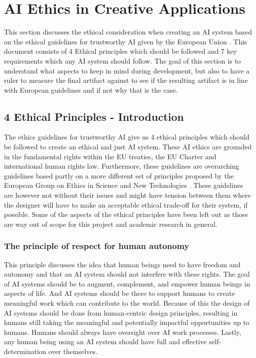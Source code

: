 \section{AI Ethics in Creative Applications} \label{AIethics}
This section discusses the ethical consideration when creating an AI system based on the ethical guidelines for trustworthy AI given by the European Union \cite{europeancommission2019ethics}. This document consists of 4 Ethical principles which should be followed and 7 key requirements which any AI system should follow. The goal of this section is to understand what aspects to keep in mind during development, but also to have a ruler to measure the final artifact against to see if the resulting artifact is in line with European guidelines and if not why that is the case.

\subsection{4 Ethical Principles - Introduction}
The ethics guidelines for trustworthy AI give us 4 ethical principles which should be followed to create an ethical and just AI system. These AI ethics are grounded in the fundamental rights within the EU treaties, the EU Charter and international human rights law. Furthermore, these guidelines are overarching guidelines based partly on a more different set of principles proposed by the European Group on Ethics in Science and New Technologies \cite{floridi2018ai4people}. These guidelines are however not without their issues and might have tension between them where the designer will have to make an acceptable ethical trade-off for their system, if possible. Some of the aspects of the ethical principles have been left out as those are way out of scope for this project and academic research in general.

\subsubsection*{The principle of respect for human autonomy}
This principle discusses the idea that human beings need to have freedom and autonomy and that an AI system should not interfere with these rights. The goal of AI systems should be to augment, complement, and empower human beings in aspects of life. And AI systems should be there to support humans to create meaningful work which can contribute to the world. Because of this the design of AI systems should be done from human-centric design principles, resulting in humans still taking the meaningful and potentially impactful opportunities up to humans. Humans should always have oversight over AI work processes. Lastly, any human being using an AI system should have full and effective self-determination over themselves.


